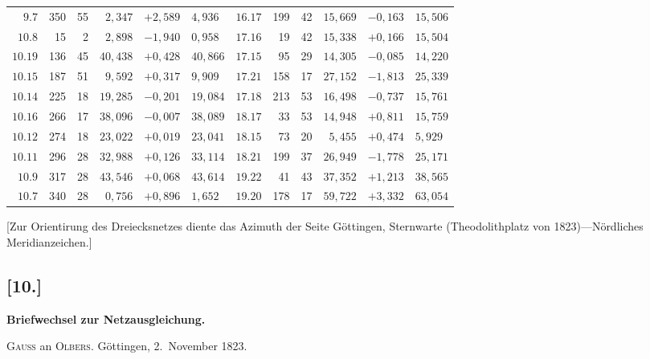 \documentclass[12pt,a4paper]{article}
\theoremstyle{plain}
\theoremstyle{definition}
\theoremstyle{remark}
\begin{document}
\begin{center}
\begin{tabular}{r|r|r|r|l|l|r|r|r|r|l|l}
$9.7$ & 350 & 55 & $2{,}347$ & $+2{,}589$ & $4{,}936$ & $16.17$ & 199 & 42 & $15{,}669$ & $-0{,}163$ & $15{,}506$\\
$10.8$ & 15 & 2 & $2{,}898$ & $-1{,}940$ & $0{,}958$ & $17.16$ & 19 & 42 & $15{,}338$ & $+0{,}166$ & $15{,}504$\\
$10.19$ & 136 & 45 & $40{,}438$ & $+0{,}428$ & $40{,}866$ & $17.15$ & 95 & 29 & $14{,}305$ & $-0{,}085$ & $14{,}220$\\
$10.15$ & 187 & 51 & $9{,}592$ & $+0{,}317$ & $9{,}909$ & $17.21$ & 158 & 17 & $27{,}152$ & $-1{,}813$ & $25{,}339$\\
$10.14$ & 225 & 18 & $19{,}285$ & $-0{,}201$ & $19{,}084$ & $17.18$ & 213 & 53 & $16{,}498$ & $-0{,}737$ & $15{,}761$\\
$10.16$ & 266 & 17 & $38{,}096$ & $-0{,}007$ & $38{,}089$ & $18.17$ & 33 & 53 & $14{,}948$ & $+0{,}811$ & $15{,}759$\\
$10.12$ & 274 & 18 & $23{,}022$ & $+0{,}019$ & $23{,}041$ & $18.15$ & 73 & 20 & $5{,}455$ & $+0{,}474$ & $5{,}929$\\
$10.11$ & 296 & 28 & $32{,}988$ & $+0{,}126$ & $33{,}114$ & $18.21$ & 199 & 37 & $26{,}949$ & $-1{,}778$ & $25{,}171$\\
$10.9$ & 317 & 28 & $43{,}546$ & $+0{,}068$ & $43{,}614$ & $19.22$ & 41 & 43 & $37{,}352$ & $+1{,}213$ & $38{,}565$\\
$10.7$ & 340 & 28 & $0{,}756$ & $+0{,}896$ & $1{,}652$ & $19.20$ & 178 & 17 & $59{,}722$ & $+3{,}332$ & $63{,}054$\\
\end{tabular}
\end{center}
\normalsize

[Zur Orientirung des Dreiecksnetzes diente das Azimuth der Seite G\"ottingen, Sternwarte (Theodolithplatz von 1823)---N\"ordliches Meridianzeichen.]

\newpage
\subsection*{[10.]}
\label{subsec:netz10}

\textbf{Briefwechsel zur Netzausgleichung.}

\medskip\noindent
\textsc{Gauss} an \textsc{Olbers}. G\"ottingen, 2.\ November 1823.
\end{document}
